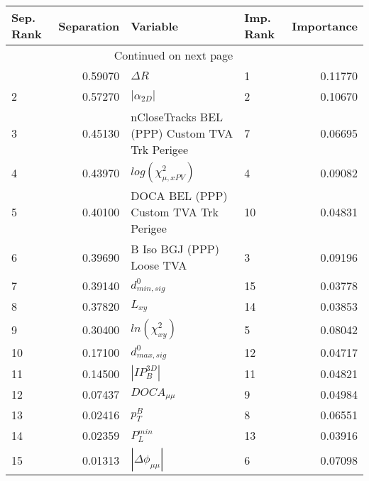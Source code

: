 \usepackage{lscape}

\begin{landscape}
\begin{longtable}{lrllr}
\toprule
Sep. Rank &  Separation &                                       Variable & Imp. Rank &  Importance \\
\midrule
\endhead
\midrule
\multicolumn{3}{r}{{Continued on next page}} \\
\midrule
\endfoot

\bottomrule
\endlastfoot
        1 &     0.59070 &                                     $\Delta R$ &         1 &     0.11770 \\
        2 &     0.57270 &                                $|\alpha_{2D}|$ &         2 &     0.10670 \\
        3 &     0.45130 &  nCloseTracks BEL (PPP) Custom TVA Trk Perigee &         7 &     0.06695 \\
        4 &     0.43970 &                      $log(\chi^{2}_{\mu,xPV})$ &         4 &     0.09082 \\
        5 &     0.40100 &          DOCA BEL (PPP) Custom TVA Trk Perigee &        10 &     0.04831 \\
        6 &     0.39690 &                      B Iso BGJ (PPP) Loose TVA &         3 &     0.09196 \\
        7 &     0.39140 &                               $d^0_{min, sig}$ &        15 &     0.03778 \\
        8 &     0.37820 &                                       $L_{xy}$ &        14 &     0.03853 \\
        9 &     0.30400 &                            $ln(\chi^{2}_{xy})$ &         5 &     0.08042 \\
       10 &     0.17100 &                               $d^0_{max, sig}$ &        12 &     0.04717 \\
       11 &     0.14500 &                                $|IP_{B}^{3D}|$ &        11 &     0.04821 \\
       12 &     0.07437 &                                $DOCA_{\mu\mu}$ &         9 &     0.04984 \\
       13 &     0.02416 &                                      $p^B_{T}$ &         8 &     0.06551 \\
       14 &     0.02359 &                                  $P^{min}_{L}$ &        13 &     0.03916 \\
       15 &     0.01313 &                       $|\Delta \phi_{\mu\mu}|$ &         6 &     0.07098 \\
\end{longtable}

\end{landscape}
